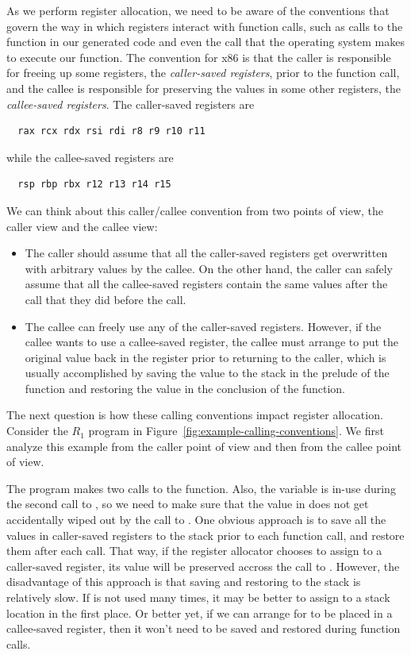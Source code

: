 \documentclass[11pt]{book}
\begin{document}
As we perform register allocation, we need to be aware of the
conventions that govern the way in which registers interact with
function calls, such as calls to the  function in our
generated code and even the call that the operating system makes to
execute our  function.  The convention for x86 is that the
caller is responsible for freeing up some registers, the
\emph{caller-saved registers}, prior to the function call, and the
callee is responsible for preserving the values in some other
registers, the \emph{callee-saved registers}. The caller-saved
registers are
\begin{lstlisting}
  rax rcx rdx rsi rdi r8 r9 r10 r11
\end{lstlisting}
while the callee-saved registers are
\begin{lstlisting}
  rsp rbp rbx r12 r13 r14 r15
\end{lstlisting}

We can think about this caller/callee convention from two points of
view, the caller view and the callee view:
\begin{itemize}
\item The caller should assume that all the caller-saved registers get
  overwritten with arbitrary values by the callee.  On the other hand,
  the caller can safely assume that all the callee-saved registers
  contain the same values after the call that they did before the
  call.
\item The callee can freely use any of the caller-saved registers.
  However, if the callee wants to use a callee-saved register, the
  callee must arrange to put the original value back in the register
  prior to returning to the caller, which is usually accomplished by
  saving the value to the stack in the prelude of the function and
  restoring the value in the conclusion of the function.
\end{itemize}

The next question is how these calling conventions impact register
allocation. Consider the $R_1$ program in
Figure~\ref{fig:example-calling-conventions}.  We first analyze this
example from the caller point of view and then from the callee point
of view.

The program makes two calls to the  function.  Also, the
variable  is in-use during the second call to , so
we need to make sure that the value in  does not get
accidentally wiped out by the call to .  One obvious
approach is to save all the values in caller-saved registers to the
stack prior to each function call, and restore them after each
call. That way, if the register allocator chooses to assign 
to a caller-saved register, its value will be preserved accross the
call to .  However, the disadvantage of this approach is
that saving and restoring to the stack is relatively slow. If 
is not used many times, it may be better to assign  to a stack
location in the first place. Or better yet, if we can arrange for
 to be placed in a callee-saved register, then it won't need
to be saved and restored during function calls.
\end{document}
